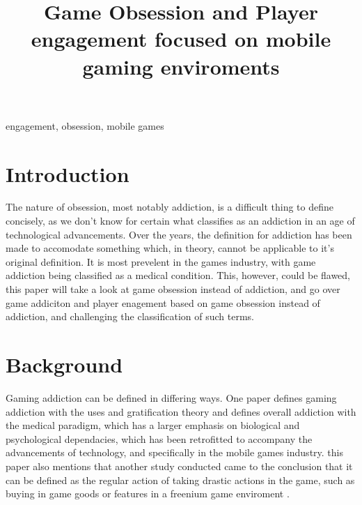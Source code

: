 \documentclass[conference]{IEEEtran}
\begin{document}
\title{Game Obsession and Player engagement focused on mobile gaming enviroments\\
}

\author{
}

\maketitle



\begin{abstract}

\end{abstract}

\begin{IEEEkeywords}
engagement, obsession, mobile games
\end{IEEEkeywords}

\section{Introduction}
The nature of obsession, most notably addiction, is a difficult thing to define concisely, as we don't know for certain what classifies as an addiction in an age of technological advancements. Over the years, the definition for addiction has been made to accomodate something which, in theory, cannot be applicable to it's original definition. It is most prevelent in the games industry, with game addiction being classified as a medical condition. This, however, could be flawed, this paper will take a look at game obsession instead of addiction, and go over game addiciton and player enagement based on game obsession instead of addiction, and challenging the classification of such terms.\\
\section{Background}
Gaming addiction can be defined in differing ways. One paper \cite{yasir2021} defines gaming addiction with the uses and gratification theory and defines overall addiction with the medical paradigm, which has a larger emphasis on biological and psychological dependacies, which has been retrofitted to accompany the advancements of technology, and specifically in the mobile games industry. this paper also mentions that another study conducted came to the conclusion that it can be defined as the regular action of taking drastic actions in the game, such as buying in game goods or features in a freenium game enviroment \cite{XWang2021}. \\
\end{document}

